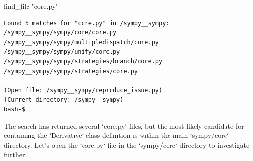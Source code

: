 {\begin{agentbox}
\hrulefill
\begin{CodeVerbatim}[breaklines=true, breakanywhere=true]
find_file "core.py"
\end{CodeVerbatim}
\end{agentbox}
\begin{observationbox}\begin{Verbatim}[breaklines=true, breakanywhere=true]
Found 5 matches for "core.py" in /sympy__sympy:
/sympy__sympy/sympy/core/core.py
/sympy__sympy/sympy/multipledispatch/core.py
/sympy__sympy/sympy/unify/core.py
/sympy__sympy/sympy/strategies/branch/core.py
/sympy__sympy/sympy/strategies/core.py

(Open file: /sympy__sympy/reproduce_issue.py)
(Current directory: /sympy__sympy)
bash-$
\end{Verbatim}
\end{observationbox}
\begin{agentbox}
The search has returned several `core.py` files, but the most likely candidate for containing the `Derivative` class definition is within the main `sympy/core` directory. Let's open the `core.py` file in the `sympy/core` directory to investigate further.




\end{agentbox}}
